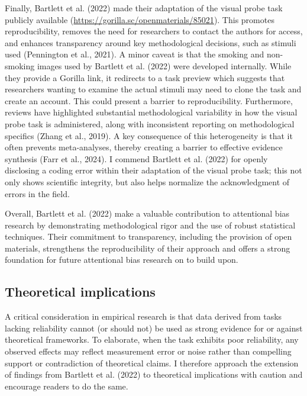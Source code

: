 \documentclass[authordate, empirical]{jote-new-article}
\begin{document}
	Finally, Bartlett et al. (2022) made their adaptation of the visual probe task publicly available (\href{https://gorilla.sc/openmaterials/85021}{https://gorilla.sc/openmaterials/85021}). This promotes reproducibility, removes the need for researchers to contact the authors for access, and enhances transparency around key methodological decisions, such as stimuli used (Pennington et al., 2021). A minor caveat is that the smoking and non-smoking images used by Bartlett et al. (2022) were developed internally. While they provide a Gorilla link, it redirects to a task preview which suggests that researchers wanting to examine the actual stimuli may need to clone the task and create an account. This could present a barrier to reproducibility. Furthermore, reviews have highlighted substantial methodological variability in how the visual probe task is administered, along with inconsistent reporting on methodological specifics (Zhang et al., 2019). A key consequence of this heterogeneity is that it often prevents meta-analyses, thereby creating a barrier to effective evidence synthesis (Farr et al., 2024). I commend Bartlett et al. (2022) for openly disclosing a coding error within their adaptation of the visual probe task; this not only shows scientific integrity, but also helps normalize the acknowledgment of errors in the field.



	Overall, Bartlett et al. (2022) make a valuable contribution to attentional bias research by demonstrating methodological rigor and the use of robust statistical techniques. Their commitment to transparency, including the provision of open materials, strengthens the reproducibility of their approach and offers a strong foundation for future attentional bias research on to build upon.



	\subsection{Theoretical implications}



	A critical consideration in empirical research is that data derived from tasks lacking reliability cannot (or should not) be used as strong evidence for or against theoretical frameworks. To elaborate, when the task exhibits poor reliability, any observed effects may reflect measurement error or noise rather than compelling support or contradiction of theoretical claims. I therefore approach the extension of findings from Bartlett et al. (2022) to theoretical implications with caution and encourage readers to do the same.
\end{document}
